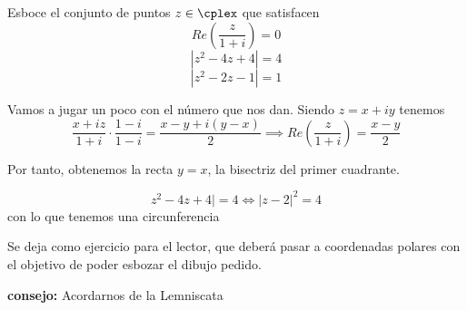 \begin{problem}[18]
Esboce el conjunto de puntos $z \in \cplex$ que satisfacen
\ppart \[Re\left( \frac{z}{1+i}\right) = 0\]
\ppart \[|z^2-4z+4| = 4\]
\ppart \[|z^2-2z-1|=1\]

\solution

\spart
Vamos a jugar un poco con el número que nos dan. Siendo $z=x+iy$ tenemos
\[\frac{x+iz}{1+i}\cdot\frac{1-i}{1-i} = \frac{x-y+i(y-x)}{2} \implies Re\left( \frac{z}{1+i}\right) = \frac{x-y}{2}\]

Por tanto, obtenemos la recta $y=x$, la bisectriz del primer cuadrante.

\spart
\[z^2-4z+4| = 4 \iff |z-2|^2 = 4 \]
con lo que tenemos una circunferencia

\spart
Se deja como ejercicio para el lector, que deberá pasar a coordenadas polares con el objetivo de poder esbozar el dibujo pedido.

\textbf{consejo:} Acordarnos de la Lemniscata
\end{problem}

